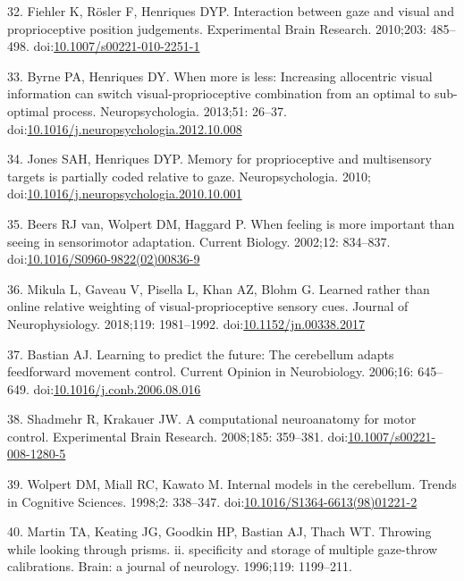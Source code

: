 \documentclass[10pt,letterpaper]{article}
\begin{document}
\hypertarget{ref-Fiehler2010}{}
32. Fiehler K, Rösler F, Henriques DYP. Interaction between gaze and
visual and proprioceptive position judgements. Experimental Brain
Research. 2010;203: 485--498.
doi:\href{https://doi.org/10.1007/s00221-010-2251-1}{10.1007/s00221-010-2251-1}

\hypertarget{ref-Byrne2013}{}
33. Byrne PA, Henriques DY. When more is less: Increasing allocentric
visual information can switch visual-proprioceptive combination from an
optimal to sub-optimal process. Neuropsychologia. 2013;51: 26--37.
doi:\href{https://doi.org/10.1016/j.neuropsychologia.2012.10.008}{10.1016/j.neuropsychologia.2012.10.008}

\hypertarget{ref-Jones2010}{}
34. Jones SAH, Henriques DYP. Memory for proprioceptive and multisensory
targets is partially coded relative to gaze. Neuropsychologia. 2010;
doi:\href{https://doi.org/10.1016/j.neuropsychologia.2010.10.001}{10.1016/j.neuropsychologia.2010.10.001}

\hypertarget{ref-VanBeers2002}{}
35. Beers RJ van, Wolpert DM, Haggard P. When feeling is more important
than seeing in sensorimotor adaptation. Current Biology. 2002;12:
834--837.
doi:\href{https://doi.org/10.1016/S0960-9822(02)00836-9}{10.1016/S0960-9822(02)00836-9}

\hypertarget{ref-Mikula2018}{}
36. Mikula L, Gaveau V, Pisella L, Khan AZ, Blohm G. Learned rather than
online relative weighting of visual-proprioceptive sensory cues. Journal
of Neurophysiology. 2018;119: 1981--1992.
doi:\href{https://doi.org/10.1152/jn.00338.2017}{10.1152/jn.00338.2017}

\hypertarget{ref-Bastian2006}{}
37. Bastian AJ. Learning to predict the future: The cerebellum adapts
feedforward movement control. Current Opinion in Neurobiology. 2006;16:
645--649.
doi:\href{https://doi.org/10.1016/j.conb.2006.08.016}{10.1016/j.conb.2006.08.016}

\hypertarget{ref-Shadmehr2008}{}
38. Shadmehr R, Krakauer JW. A computational neuroanatomy for motor
control. Experimental Brain Research. 2008;185: 359--381.
doi:\href{https://doi.org/10.1007/s00221-008-1280-5}{10.1007/s00221-008-1280-5}

\hypertarget{ref-Wolpert1998}{}
39. Wolpert DM, Miall RC, Kawato M. Internal models in the cerebellum.
Trends in Cognitive Sciences. 1998;2: 338--347.
doi:\href{https://doi.org/10.1016/S1364-6613(98)01221-2}{10.1016/S1364-6613(98)01221-2}

\hypertarget{ref-Martin1996}{}
40. Martin TA, Keating JG, Goodkin HP, Bastian AJ, Thach WT. Throwing
while looking through prisms. ii. specificity and storage of multiple
gaze-throw calibrations. Brain: a journal of neurology. 1996;119:
1199--211.
\end{document}

